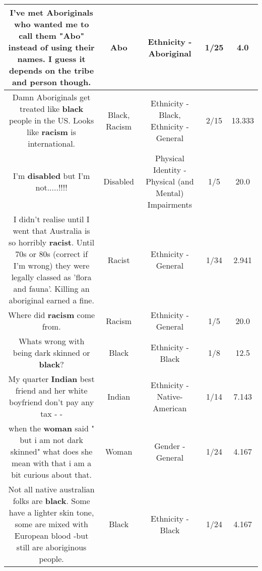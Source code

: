 \documentclass[11pt]{article}
\newlength\mylength
\begin{document}
\begin{center}
\begin{longtable}{|C{.65\mylength}|C{.30\mylength}|C{.12\mylength}|C{.12\mylength}|C{.12\mylength}|}
  \small I've met Aboriginals who wanted me to call them "\textbf{Abo}" instead of using their names.  I guess it depends on the tribe and person though.\normalsize   & Abo & Ethnicity - Aboriginal & 1/25 & 4.0 \\  \hline
  \small Damn Aboriginals get treated like \textbf{black} people in the US. Looks like \textbf{racism} is international.\normalsize   & Black, Racism & Ethnicity - Black, Ethnicity - General & 2/15 & 13.333 \\  \hline
  \small I'm \textbf{disabled} but I'm not.....!!!!\normalsize   & Disabled & Physical Identity - Physical (and Mental) Impairments & 1/5 & 20.0 \\  \hline
  \small I didn't realise until I went that Australia is so horribly \textbf{racist}. Until 70s or 80s (correct if I'm wrong) they were legally classed as 'flora and fauna'. Killing an aboriginal earned a fine.\normalsize   & Racist & Ethnicity - General & 1/34 & 2.941 \\  \hline
  \small Where did \textbf{racism} come from.\normalsize   & Racism & Ethnicity - General & 1/5 & 20.0 \\  \hline
  \small Whats wrong with being dark skinned or \textbf{black}?\normalsize   & Black & Ethnicity - Black & 1/8 & 12.5 \\  \hline
  \small My quarter \textbf{Indian} best friend and her white boyfriend don't pay any tax - -\normalsize   & Indian & Ethnicity - Native-American & 1/14 & 7.143 \\  \hline
  \small when the \textbf{woman} said " but i am not dark skinned" what does she mean with that i am a bit curious about that.\normalsize   & Woman & Gender - General & 1/24 & 4.167 \\  \hline
  \small Not all native australian folks are \textbf{black}. Some have a lighter skin tone, some are mixed with European blood -but still are aboriginous people.\normalsize   & Black & Ethnicity - Black & 1/24 & 4.167 \\  \hline

\end{longtable}
\end{center}
\end{document}
